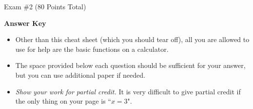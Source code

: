 \documentclass[twoside]{article}
\begin{document}
\begin{center}
\Large Exam \#2 (80 Points Total) \begin{KEY}\textbf{Answer Key}\end{KEY}
\end{center}
\normalsize
\bigskip


\begin{EXAM}

\begin{itemize}

\item Other than this cheat sheet (which you should tear off), all you are allowed to use for help are the basic functions on a calculator.

\item The space provided below each question should be sufficient for your answer, but you can use additional paper if needed.

\item \emph{Show your work for partial credit.} It is very difficult to give partial credit if the only thing on your page is ``$x=3$".

\begin{comment}
\item Take the exam during an \emph{uninterrupted period of no more than 3 hours}. (It should not take that long.) The space provided below each question should be sufficient for your answer, but you can use additional paper if needed. \emph{You are encouraged to show your work for partial credit.} It is very difficult to give partial credit if the only thing on your page is ``$x=3$".

\item \emph{Other than this cheat sheet, all you are allowed to use for help are the basic functions on a calculator.} Partial translation: no books, no notes, no websites, no talking to other people, and no advanced calculator features like programmable functions or present value formulas.

\item People who have taken the exam can talk to each other all they want, and people who have not taken the exam can talk to each other all they want, but communication between the two groups about class should be limited to three phrases: ``Yes", ``No", and ``Have you taken the exam?"

\item For questions or other emergencies, call me at x5124 or 206-351-5719.
\end{comment}


\end{itemize}
\end{EXAM}
\end{document}
